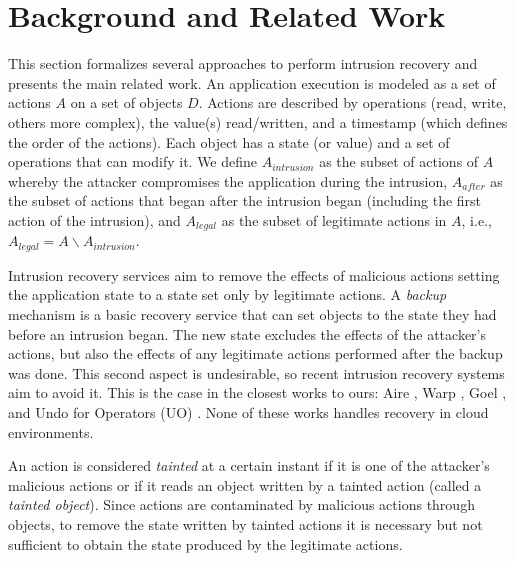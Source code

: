 
\section{Background and Related Work}\label{sec:background}

This section formalizes several approaches to perform intrusion recovery and presents the main related work. 
%
An application execution is modeled as a set of actions $A$ on a set of objects $D$. Actions are described by operations (read, write, others more complex), the value(s) read/written, and a timestamp (which defines the order of the actions). Each object has a state (or value) and a set of operations that can modify it. We define $A_{intrusion}$ as the subset of actions of $A$ whereby the attacker compromises the application during the intrusion, $A_{after}$ as the subset of actions that began after the intrusion began (including the first action of the intrusion), and $A_{legal}$ as the subset of legitimate actions in $A$, i.e., $A_{legal} = A \backslash A_{intrusion}$.

Intrusion recovery services aim to remove the effects of malicious actions setting the application state to a state set only by legitimate actions. 
%
A \textit{backup} mechanism is a basic recovery service that can set objects to the state they had before an intrusion began. The new state excludes the effects of the attacker's actions, but also the effects of any legitimate actions performed after the backup was done. This second aspect is undesirable, so recent intrusion recovery systems aim to avoid it.
%
This is the case in the closest works to ours: Aire \cite{aire}, Warp \cite{warp}, Goel \cite{Akkus2010}, and Undo for Operators (UO) \cite{undoForOperators}. None of these works handles recovery in cloud environments.

An action is considered \textit{tainted} at a certain instant if it is one of the attacker's malicious actions or if it reads an object written by a tainted action (called a \textit{tainted object}). Since actions are contaminated by malicious actions through objects, to remove the state written by tainted actions it is necessary but not sufficient to obtain the state produced by the legitimate actions. 

